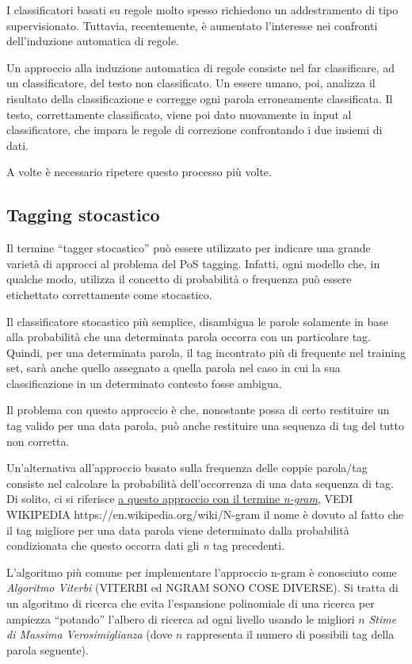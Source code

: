 I classificatori basati su regole molto spesso richiedono un addestramento di
tipo supervisionato. Tuttavia, recentemente, \`e aumentato l'interesse nei
confronti dell'induzione automatica di regole.

Un approccio alla induzione automatica di regole consiste nel far classificare,
ad un classificatore, del testo non classificato. Un essere umano, poi, analizza
il risultato della classificazione e corregge ogni parola erroneamente classificata.
Il testo, correttamente classificato, viene poi dato nuovamente in input al
classificatore, che impara le regole di correzione confrontando i due insiemi di
dati.

A volte \`e necessario ripetere questo processo pi\`u volte.

\subsection{Tagging stocastico}

Il termine ``tagger stocastico'' pu\`o essere utilizzato per indicare una grande
variet\`a di approcci al problema del PoS tagging. Infatti, ogni modello che, in
qualche modo, utilizza il concetto di probabilit\`a o frequenza pu\`o essere
etichettato correttamente come stocastico.

Il classificatore stocastico pi\`u semplice, disambigua le parole solamente in
base alla probabilit\`a che una determinata parola occorra con un particolare tag.
Quindi, per una determinata parola, il tag incontrato pi\`u di frequente nel
training set, sar\`a anche quello assegnato a quella parola nel caso in cui la
sua classificazione in un determinato contesto fosse ambigua.

Il problema con questo approccio \`e che, nonostante possa di certo restituire
un tag valido per una data parola, pu\`o anche restituire una sequenza di tag del
tutto non corretta.

Un'alternativa all'approccio basato sulla frequenza delle coppie parola/tag
consiste nel calcolare la probabilit\`a dell'occorrenza di una data sequenza di
tag. Di solito, ci si riferisce \underline{a questo approccio con il termine \emph{n-gram},} VEDI WIKIPEDIA https://en.wikipedia.org/wiki/N-gram
il nome \`e dovuto al fatto che il tag migliore per una data parola viene
determinato dalla probabilit\`a condizionata che questo occorra dati gli \emph{n}
tag precedenti.

L'algoritmo pi\`u comune per implementare l'approccio n-gram \`e conosciuto come
\emph{Algoritmo Viterbi} (VITERBI ed NGRAM SONO COSE DIVERSE). Si tratta di un algoritmo di ricerca che evita
l'espansione polinomiale di una ricerca per ampiezza ``potando'' l'albero di
ricerca ad ogni livello usando le migliori $n$ \emph{Stime di Massima Verosimiglianza}
(dove $n$ rappresenta il numero di possibili tag della parola seguente).


